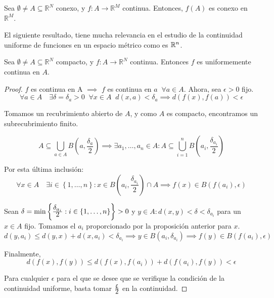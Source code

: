 \begin{nth}
Sea $\emptyset \ne A\subseteq \mathbb{R}^N$ conexo, y $f:A \longrightarrow \mathbb{R}^M$ continua. Entonces, $f(A)$ es conexo en $\mathbb{R}^M$.
\end{nth}

El siguiente resultado, tiene mucha relevancia en el estudio de la continuidad uniforme de funciones en un espacio métrico como es $\mathbb{R}^n$.
\begin{nth}
	Sea $\emptyset\ne A \subseteq \mathbb{R}^N$ compacto, y $f : A \longrightarrow \mathbb{R}^N$ continua. Entonces $f$ es uniformemente continua en $A$.
\end{nth}


\begin{proof}
	$f$ es continua en A $\implies$ $f$ es continua en $a\;\; \forall a \in A$. Ahora, sea $\epsilon>0$ fijo.
	\[
	    \forall a \in A \quad \exists \delta = \delta_a > 0\;\; \forall x\in A\;\; d(x,a) < \delta_a \implies d(f(x),f(a))<\epsilon
	\]

	Tomamos un recubrimiento abierto de $A$, y como $A$ es compacto, encontramos un subrecubrimiento finito.

	\[
		A \subseteq \bigcup_{a\in A} B(a, \frac{\delta_a}{2}) \implies \exists a_1,\dots,a_n \in A: A \subseteq \bigcup_{i=1}^n B\left(a_i, \frac{\delta_{a_i}}{2}\right)
	\]

	Por esta última inclusión:
	\[
		\forall x\in A\quad \exists i \in \left \{ 1,\dots,n \right \} : x\in B\left(a_i,\frac{\delta_{a_i}}{2}\right)\cap A \implies f(x)\in B(f(a_i),\epsilon)
	\]

	Sean $\delta = \min\left\{\frac{\displaystyle \delta_{a_i}}{\displaystyle 2} : i \in \left \{ 1,\dots,n \right \}\right\} > 0$ y $y\in A : d(x,y) < \delta < \delta_{a_i}$ para un $x\in A$ fijo. Tomamos el $a_i$ proporcionado por la proposición anterior para $x$.
	\[
		d(y,a_i) \le d(y,x)+d(x,a_i) < \delta_{a_i} \implies y\in B(a_i,\delta_{a_i}) \implies f(y) \in B(f(a_i), \epsilon)
	\]

	Finalmente,
	\[
		d(f(x), f(y)) \le d(f(x),f(a_i)) + d(f(a_i), f(y)) < \epsilon
	\]

	Para cualquier $\epsilon$ para el que se desee que se verifique la condición de la continuidad uniforme, basta tomar $\frac{\displaystyle \upvarepsilon}{\displaystyle 2}$ en la continuidad.
\end{proof}

